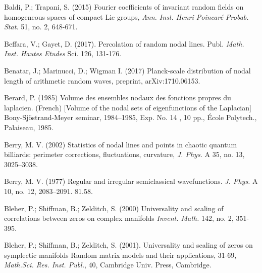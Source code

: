 \begin{thebibliography}{99}
	 Baldi, P.; Trapani, S. (2015) Fourier coefficients of invariant random fields on homogeneous spaces of compact Lie groups, \textit{Ann. Inst. Henri Poincar\'e Probab. Stat. }51, no. 2, 648-671.
	
	
	
	 Beffara, V.; Gayet, D. (2017). Percolation of random nodal lines. Publ. \textit{Math. Inst. Hautes Etudes} Sci. 126, 131-176.
	
	 Benatar, J.; Marinucci, D.; Wigman I. (2017) Planck-scale distribution of nodal length of arithmetic random waves, preprint,
	arXiv:1710.06153.
	
	 Berard, P. (1985) Volume des ensembles nodaux des fonctions propres du laplacien. (French) [Volume of the nodal sets of eigenfunctions of the Laplacian] Bony-Sjöstrand-Meyer seminar, 1984–1985, Exp. No. 14 , 10 pp., École Polytech., Palaiseau, 1985. 
	
	 Berry, M. V. (2002) Statistics of nodal lines and points in chaotic quantum billiards: perimeter corrections, fluctuations, curvature, \textit{J. Phys. }A 35, no. 13, 3025–3038. 
	
	 Berry, M. V. (1977) Regular and irregular semiclassical wavefunctions. \textit{J. Phys.} A 10, no. 12, 2083–2091. 81.58.
	
	 Bleher, P.; Shiffman, B.; Zelditch, S. (2000) Universality and scaling of correlations between zeros on complex manifolds \textit{Invent. Math.} 142, no. 2, 351-395.
	
	 Bleher, P.; Shiffman, B.; Zelditch, S. (2001). Universality and scaling of zeros on symplectic manifolds Random matrix models and their applications, 31-69, \textit{Math.Sci. Res. Inst. Publ.}, 40, Cambridge Univ. Press, Cambridge.
	
	
	
	

\end{thebibliography}
